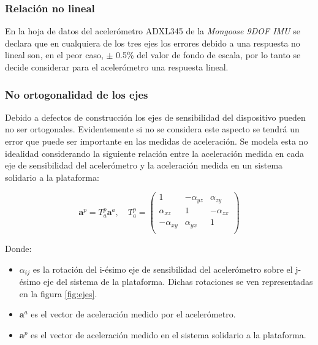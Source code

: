 \documentclass[main]{subfiles}
\begin{document}
\subsubsection*{Relación no lineal}
En la hoja de datos del acelerómetro ADXL345 de la \emph{Mongoose 9DOF IMU} se declara que en cualquiera de los tres ejes los errores debido a una respuesta no lineal son, en el peor caso, $\pm$ 0.5\% del valor de fondo de escala, por lo tanto se decide considerar para el acelerómetro una respuesta lineal.

\subsubsection*{No ortogonalidad de los ejes}
Debido a defectos de construcción los ejes de sensibilidad del dispositivo pueden no ser ortogonales. Evidentemente si no se considera este aspecto se tendrá un error que puede ser importante en las medidas de aceleración. Se modela esta no idealidad considerando la siguiente relación entre la aceleración medida en cada eje de sensibilidad del acelerómetro y la aceleración medida en un sistema solidario a la plataforma:

$$\mathbf{a}^p=T^p_a \mathbf{a}^a, \quad  T^p_a=\left( \begin{matrix}
1 &-\alpha_{yz} &\alpha_{zy}\\
\alpha_{xz} &1& -\alpha_{zx} \\
-\alpha_{xy} &\alpha_{yx} &1\\
\end{matrix} 
\right)$$

Donde:
\begin{itemize}
\item $\alpha_{ij}$ es la rotación del  i-ésimo eje de sensibilidad del acelerómetro sobre el j-ésimo eje del sistema de la plataforma. Dichas rotaciones se ven representadas en la figura \ref{fig:ejes}.
\item $\mathbf{a}^a$ es el vector de aceleración medido por el acelerómetro.
\item $\mathbf{a}^p$ es el vector de aceleración medido en el sistema solidario a la plataforma.
\end{itemize}
\end{document}
